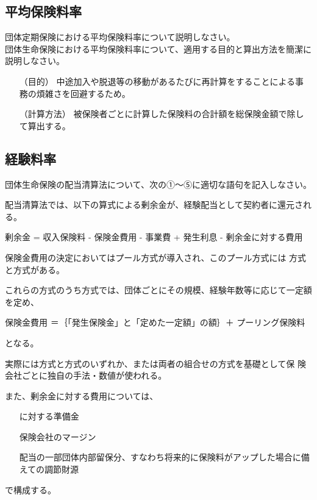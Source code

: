 \documentclass[report,gutter=10mm,fore-edge=10mm,uplatex,dvipdfmx]{jlreq}
\begin{document}
\subsection{平均保険料率}
団体定期保険における平均保険料率について説明しなさい。\\
団体生命保険における平均保険料率について、適用する目的と算出方法を簡潔に説明しなさい。
\answer{}
\begin{itemize}
\item[ （目的）] 中途加入や脱退等の移動があるたびに再計算をすることによる事務の煩雑さを回避するため。
\item[ （計算方法）] 被保険者ごとに計算した保険料の合計額を総保険金額で除して算出する。
\end{itemize}

\subsection{経験料率}


団体生命保険の配当清算法について、次の①～⑤に適切な語句を記入しなさい。

配当清算法では、以下の算式による剰余金が、経験配当として契約者に還元される。

剰余金 = 収入保険料 - 保険金費用 - 事業費 + 発生利息 - 剰余金に対する費用

保険金費用の決定においてはプール方式が導入され、このプール方式には
方式と方式がある。

これらの方式のうち方式では、団体ごとにその規模、経験年数等に応じて一定額を定め、

保険金費用 ＝｛「発生保険金」と「定めた一定額」の額｝＋ プーリング保険料

となる。

実際には方式と方式のいずれか、または両者の組合せの方式を基礎として保
険会社ごとに独自の手法・数値が使われる。

また、剰余金に対する費用については、

\begin{itemize}
\item[] に対する準備金
\item[] 保険会社のマージン
\item[] 配当の一部団体内部留保分、すなわち将来的に保険料がアップした場合に備えての調節財源
\item[] 
\end{itemize}
で構成する。
\end{document}
